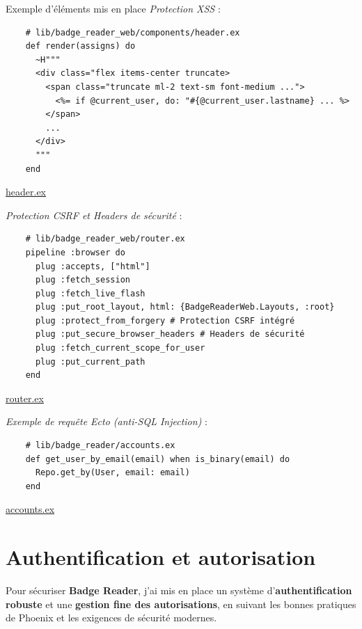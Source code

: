 \begin{for_you}{Exemple d'éléments mis en place}
\textit{Protection XSS} :
  \begin{lstlisting}
    # lib/badge_reader_web/components/header.ex
    def render(assigns) do
      ~H"""
      <div class="flex items-center truncate>
        <span class="truncate ml-2 text-sm font-medium ...">
          <%= if @current_user, do: "#{@current_user.lastname} ... %>
        </span>
        ...
      </div>
      """
    end
  \end{lstlisting}

  \href{https://github.com/Theoden-bernard/badge_reader_project/blob/develop/badge_reader/lib/badge_reader_web/components/header.ex}{header.ex \newline}

  \textit{Protection CSRF et Headers de sécurité} :
  \begin{lstlisting}
    # lib/badge_reader_web/router.ex
    pipeline :browser do
      plug :accepts, ["html"]
      plug :fetch_session
      plug :fetch_live_flash
      plug :put_root_layout, html: {BadgeReaderWeb.Layouts, :root}
      plug :protect_from_forgery # Protection CSRF intégré
      plug :put_secure_browser_headers # Headers de sécurité
      plug :fetch_current_scope_for_user
      plug :put_current_path
    end
  \end{lstlisting}

  \href{https://github.com/Theoden-bernard/badge_reader_project/blob/develop/badge_reader/lib/badge_reader_web/router.ex}{router.ex \newline}

  \textit{Exemple de requête Ecto (anti-SQL Injection)} :
  \begin{lstlisting}
    # lib/badge_reader/accounts.ex
    def get_user_by_email(email) when is_binary(email) do
      Repo.get_by(User, email: email)
    end
  \end{lstlisting}

  \href{https://github.com/Theoden-bernard/badge_reader_project/blob/develop/badge_reader/lib/badge_reader/accounts.ex}{accounts.ex}

\end{for_you}

\newpage

\section{Authentification et autorisation}
Pour sécuriser \textbf{Badge Reader}, j’ai mis en place un système d’\textbf{authentification robuste} et une \textbf{gestion fine des autorisations}, en suivant les bonnes pratiques de Phoenix et les exigences de sécurité modernes.

